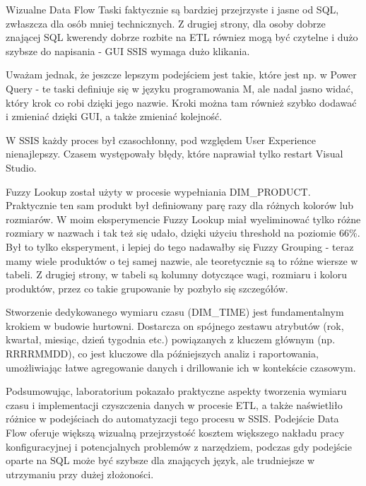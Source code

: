 \documentclass[a4paper,12pt]{article}
\begin{document}
Wizualne Data Flow Taski faktycznie są bardziej przejrzyste i jasne od SQL, zwłaszcza dla osób mniej technicznych. Z drugiej strony, dla osoby dobrze znającej SQL kwerendy dobrze rozbite na ETL równiez mogą być czytelne i dużo szybsze do napisania - GUI SSIS wymaga dużo klikania.

Uważam jednak, że jeszcze lepszym podejściem jest takie, które jest np. w Power Query - te taski definiuje się w języku programowania M, ale nadal jasno widać, który krok co robi dzięki jego nazwie. Kroki można tam również szybko dodawać i zmieniać dzięki GUI, a także zmieniać kolejność.

W SSIS każdy proces był czasochłonny, pod względem User Experience nienajlepszy. Czasem występowały błędy, które naprawiał tylko restart Visual Studio.

Fuzzy Lookup został użyty w procesie wypełniania DIM\_PRODUCT. Praktycznie ten sam produkt był definiowany parę razy dla różnych kolorów lub rozmiarów. W moim eksperymencie Fuzzy Lookup miał wyeliminować tylko różne rozmiary w nazwach i tak też się udało, dzięki użyciu threshold na poziomie 66\%. Był to tylko eksperyment, i lepiej do tego nadawałby się Fuzzy Grouping - teraz mamy wiele produktów o tej samej nazwie, ale teoretycznie są to różne wiersze w tabeli. Z drugiej strony, w tabeli są kolumny dotyczące wagi, rozmiaru i koloru produktów, przez co takie grupowanie by pozbyło się szczegółów.

Stworzenie dedykowanego wymiaru czasu (DIM\_TIME) jest fundamentalnym krokiem w budowie hurtowni. Dostarcza on spójnego zestawu atrybutów (rok, kwartał, miesiąc, dzień tygodnia etc.) powiązanych z kluczem głównym (np. RRRRMMDD), co jest kluczowe dla późniejszych analiz i raportowania, umożliwiając łatwe agregowanie danych i drillowanie ich w kontekście czasowym.

Podsumowując, laboratorium pokazało praktyczne aspekty tworzenia wymiaru czasu i implementacji czyszczenia danych w procesie ETL, a także naświetliło różnice w podejściach do automatyzacji tego procesu w SSIS. Podejście Data Flow oferuje większą wizualną przejrzystość kosztem większego nakładu pracy konfiguracyjnej i potencjalnych problemów z narzędziem, podczas gdy podejście oparte na SQL może być szybsze dla znających język, ale trudniejsze w utrzymaniu przy dużej złożoności.

\printbibliography
\end{document}
